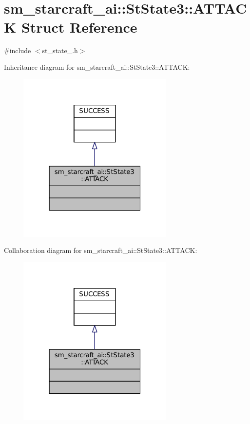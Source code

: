\hypertarget{structsm__starcraft__ai_1_1StState3_1_1ATTACK}{}\section{sm\+\_\+starcraft\+\_\+ai\+:\+:St\+State3\+:\+:A\+T\+T\+A\+CK Struct Reference}
\label{structsm__starcraft__ai_1_1StState3_1_1ATTACK}


{\ttfamily \#include $<$st\+\_\+state\+\_.\+h$>$}



Inheritance diagram for sm\+\_\+starcraft\+\_\+ai\+:\+:St\+State3\+:\+:A\+T\+T\+A\+CK\+:
\nopagebreak
\begin{figure}[H]
\begin{center}
\leavevmode
\includegraphics[width=220pt]{structsm__starcraft__ai_1_1StState3_1_1ATTACK__inherit__graph}
\end{center}
\end{figure}


Collaboration diagram for sm\+\_\+starcraft\+\_\+ai\+:\+:St\+State3\+:\+:A\+T\+T\+A\+CK\+:
\nopagebreak
\begin{figure}[H]
\begin{center}
\leavevmode
\includegraphics[width=220pt]{structsm__starcraft__ai_1_1StState3_1_1ATTACK__coll__graph}
\end{center}
\end{figure}



